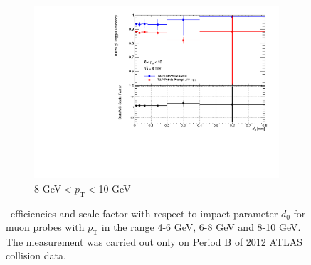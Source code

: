 \begin{figure}[tbhp]
  \begin{subfigure}[b]{0.55\textwidth}
    \includegraphics[width=\textwidth]{PartCalibration2012/Plots/SFPlots/ptCourse_8_10__smt.pdf}
    \caption{8 GeV$<p_{\textrm{T}}<$10 GeV} \label{fig:CalibrationD08to10}
  \end{subfigure}
  \caption{\xsm\ efficiencies and scale factor with respect to impact parameter $d_{0}$ for muon probes with $p_{\textrm{T}}$ in the range  4-6 GeV,  6-8 GeV and  8-10 GeV. The measurement was carried out only on Period B of 2012 ATLAS collision data.} \label{fig:CalibrationD0Results}
\end{figure}